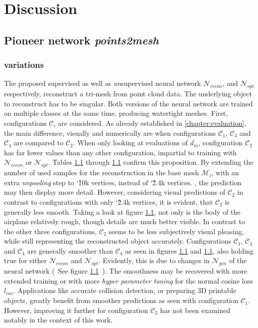 \chapter{Discussion}
\label{sec:dicussion}

\section{Pioneer network \emph{points2mesh}}
\subsection*{variations}

  The proposed supervised as well as \emph{un}supervised neural network $\mathcal{N}_{recon}$, and $\mathcal{N}_{opt}$ respectively, 
  reconstruct a tri-mesh from point cloud data. The underlying object to reconstruct has to be singular. Both versions of the neural 
  network are trained on multiple classes at the same time, producing watertight meshes.
  First, configurations $\mathcal{C}_i$ are considered. As already established in \ref{chapter:evaluation}, the main difference, visually and 
  numerically are when configurations $\mathcal{C}_1$, $\mathcal{C}_3$ and $\mathcal{C}_4$ are compared to $\mathcal{C}_2$. When only looking
  at evaluations of $d_m$, configuration $\mathcal{C}_2$ has far lower values than any other configuration, impartial to training with 
  $\mathcal{N}_{recon}$ or $\mathcal{N}_{opt}$. Tables \ref{} through \ref{} confirm this proposition. By extending the number of used
  samples for the reconstruction in the base mesh $\mathcal{M}_i$, with an extra \emph{unpooling} step to \char`\~10k vertices, instead of
  \char`\~2.4k vertices.  , the prediction may then display more detail. 
  However, considering visual predictions of $\mathcal{C}_2$ in contrast to configurations with only \char`\~2.4k vertices, it is evident, 
  that $\mathcal{C}_2$ is generally less smooth. Taking a look at figure \ref{}, not only is the body of the airplane relatively rough,
  though details are much better visible. In contrast to the other three configurations, $\mathcal{C}_2$ seems to be less subjectively 
  visual pleasing, while still representing the reconstructed object accurately.  Configurations $\mathcal{C}_1$, $\mathcal{C}_3$ and 
  $\mathcal{C}_4$ are generally smoother than $\mathcal{C}_4$ as seen in figures \ref{} and \ref{}, also holding true for either $\mathcal{N}_{recon}$ 
  and $\mathcal{N}_{opt}$.
  Evidently, this is due to changes in $\mathcal{N}_{gcn}$ of the neural network (~See figure \ref{}~). The smoothness may be recovered 
  with more extended training or with more \emph{hyper parameter tuning} for the normal cosine loss $l_{cos}$. Applications like accurate 
  collision detection, or preparing 3D printable objects, greatly benefit from smoother predictions as seen with configuration $\mathcal{C}_1$.
  However, improving it further for configuration $\mathcal{C}_2$ has not been examined notably in the context of this work.


